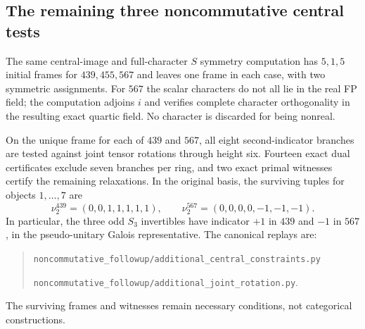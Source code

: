 \subsection{The remaining three noncommutative central tests}
\label{subsec:frontier-additional-nc-central}

The same central-image and full-character $S$ symmetry computation has
$5,1,5$ initial frames for $439,455,567$ and leaves one frame in each
case, with two symmetric assignments. For $567$ the scalar characters
do not all lie in the real FP field; the computation adjoins $i$ and
verifies complete character orthogonality in the resulting exact
quartic field. No character is discarded for being nonreal.

On the unique frame for each of $439$ and $567$, all eight second-indicator
branches are tested against joint tensor rotations through height six.
Fourteen exact dual certificates exclude seven branches per ring, and
two exact primal witnesses certify the remaining relaxations. In the
original basis, the surviving tuples for objects $1,\ldots,7$ are
\[
 \nu_2^{439}=(0,0,1,1,1,1,1),\qquad
 \nu_2^{567}=(0,0,0,0,-1,-1,-1).
\]
In particular, the three odd $S_3$ invertibles have indicator $+1$ in
$439$ and $-1$ in $567$, in the pseudo-unitary Galois representative.
The canonical replays are:
\begin{quote}\small
\texttt{noncommutative\_followup/additional\_central\_constraints.py}\par
\texttt{noncommutative\_followup/additional\_joint\_rotation.py}.
\end{quote}
The surviving frames and witnesses remain necessary conditions, not
categorical constructions.
